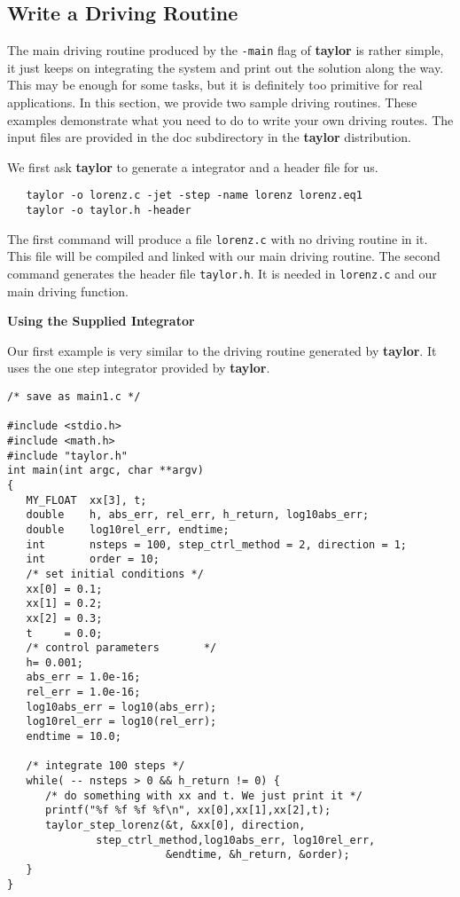 \documentclass{article}
\begin{document}
{\subsection{Write a Driving Routine}
The main driving routine produced by the {\tt -main}
flag of {\bf taylor}
is rather simple, it just keeps on integrating the 
system and print out the solution along the way.
This may be enough for some tasks, but it is
definitely too primitive for real applications.
In this section, we provide two sample
driving routines.  These examples demonstrate
what you need to do to write your own driving
routes. The input files are provided in the doc
subdirectory in the {\bf taylor} distribution.

We first ask {\bf taylor} to generate
a integrator and a header file for us. 
\begin{verbatim}
   taylor -o lorenz.c -jet -step -name lorenz lorenz.eq1
   taylor -o taylor.h -header
\end{verbatim}
The first command will produce a file \verb+lorenz.c+
with no driving routine in it.  This file will be
compiled and linked with our main driving routine.
The second command generates the header file
\verb+taylor.h+. It is needed in \verb+lorenz.c+ and
our main driving function.


\vspace{3mm}
\noindent
{\bf Using the Supplied Integrator}

\noindent
Our first example is very similar to the 
driving routine generated by {\bf taylor}.
It uses the one step integrator provided by
{\bf taylor}.

\begin{verbatim}
/* save as main1.c */

#include <stdio.h>
#include <math.h>
#include "taylor.h"
int main(int argc, char **argv)
{
   MY_FLOAT  xx[3], t;
   double    h, abs_err, rel_err, h_return, log10abs_err;
   double    log10rel_err, endtime;
   int       nsteps = 100, step_ctrl_method = 2, direction = 1;
   int       order = 10;
   /* set initial conditions */
   xx[0] = 0.1;
   xx[1] = 0.2;
   xx[2] = 0.3;
   t     = 0.0;
   /* control parameters       */
   h= 0.001;
   abs_err = 1.0e-16;
   rel_err = 1.0e-16;
   log10abs_err = log10(abs_err); 
   log10rel_err = log10(rel_err); 
   endtime = 10.0;

   /* integrate 100 steps */
   while( -- nsteps > 0 && h_return != 0) {
      /* do something with xx and t. We just print it */
      printf("%f %f %f %f\n", xx[0],xx[1],xx[2],t);
      taylor_step_lorenz(&t, &xx[0], direction,
              step_ctrl_method,log10abs_err, log10rel_err, 
                         &endtime, &h_return, &order);
   }
}
\end{verbatim}

}
\end{document}
